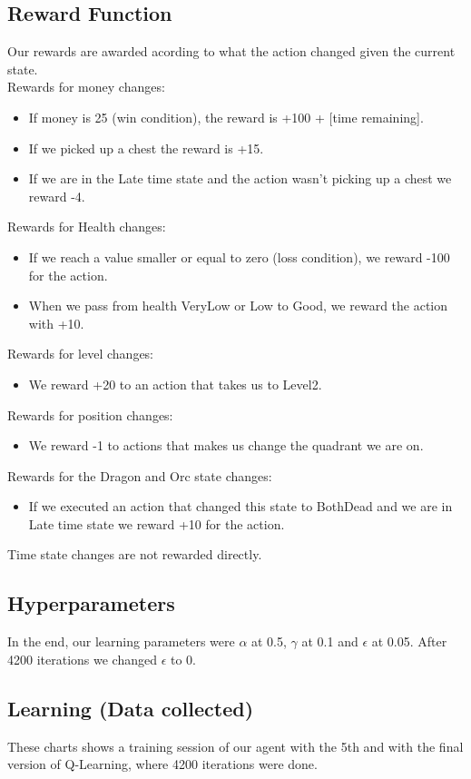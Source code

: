 \documentclass{article}
\begin{document}
  \subsection{Reward Function}
  Our rewards are awarded acording to what the action changed given the current state.\\
  Rewards for money changes:
  \begin{itemize}
    \item If money is 25 (win condition), the reward is +100 + [time remaining].
    \item If we picked up a chest the reward is +15.
    \item If we are in the Late time state and the action wasn't picking up a chest we reward -4.
  \end{itemize}
  Rewards for Health changes:
  \begin{itemize}
    \item If we reach a value smaller or equal to zero (loss condition), we reward -100 for the action.
    \item When we pass from health VeryLow or Low to Good, we reward the action with +10.
  \end{itemize}
  Rewards for level changes:
  \begin{itemize}
    \item We reward +20 to an action that takes us to Level2.
  \end{itemize}
  Rewards for position changes:
  \begin{itemize}
    \item We reward -1 to actions that makes us change the quadrant we are on.
  \end{itemize}
  Rewards for the Dragon and Orc state changes:
  \begin{itemize}
    \item If we executed an action that changed this state to BothDead and we are in Late time state we reward +10 for the action.
  \end{itemize}
  Time state changes are not rewarded directly.\\

  \subsection{Hyperparameters}
  In the end, our learning parameters were $\alpha$ at 0.5, $\gamma$ at 0.1 and $\epsilon$ at 0.05.
  After 4200 iterations we changed $\epsilon$ to 0.

  \subsection{Learning (Data collected)}
  These charts shows a training session of our agent with the 5th and with the final version of Q-Learning, where 4200 iterations were done.\\
  
\end{document}
